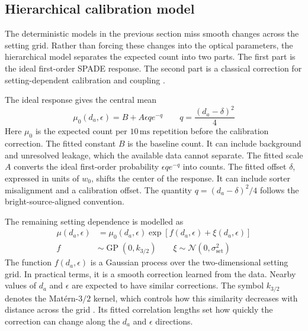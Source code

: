 \subsection{Hierarchical calibration model}

The deterministic models in the previous section miss smooth changes across the setting grid.  Rather than forcing these changes into the optical parameters, the hierarchical model separates the expected count into two parts.  The first part is the ideal first-order SPADE response.  The second part is a classical correction for setting-dependent calibration and coupling \cite{aigrain2023gaussian}.

The ideal response gives the central mean
\begin{equation}
    \mu_0(d_a,\epsilon)
    =B+A\epsilon q e^{-q}
    \qquad
    q=\frac{(d_a-\delta)^2}{4}
    \label{eq:spade_effective_count_model}
\end{equation}
Here $\mu_0$ is the expected count per $10\,\mathrm{ms}$ repetition before the calibration correction.  The fitted constant $B$ is the baseline count.  It can include background and unresolved leakage, which the available data cannot separate.  The fitted scale $A$ converts the ideal first-order probability $\epsilon q e^{-q}$ into counts.  The fitted offset $\delta$, expressed in units of $w_0$, shifts the center of the response.  It can include sorter misalignment and a calibration offset.  The quantity $q=(d_a-\delta)^2/4$ follows the bright-source-aligned convention.

The remaining setting dependence is modelled as
\begin{equation}
    \begin{aligned}
        \mu(d_a,\epsilon)
          & =\mu_0(d_a,\epsilon)
        \exp\!\left[f(d_a,\epsilon)+\xi(d_a,\epsilon)\right] \\
        f & \sim\operatorname{GP}(0,k_{3/2})
        \qquad
        \xi\sim\mathcal{N}(0,\sigma_{\mathrm{set}}^2)
    \end{aligned}
    \label{eq:spade_calibration_gp}
\end{equation}
The function $f(d_a,\epsilon)$ is a Gaussian process over the two-dimensional setting grid.  In practical terms, it is a smooth correction learned from the data.  Nearby values of $d_a$ and $\epsilon$ are expected to have similar corrections.  The symbol $k_{3/2}$ denotes the Mat\'ern-$3/2$ kernel, which controls how this similarity decreases with distance across the grid \cite{aigrain2023gaussian}.  Its fitted correlation lengths set how quickly the correction can change along the $d_a$ and $\epsilon$ directions.

